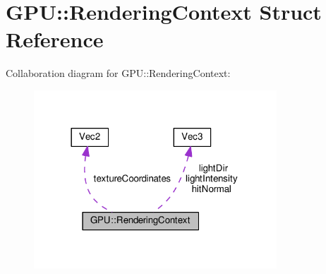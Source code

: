 \hypertarget{struct_g_p_u_1_1_rendering_context}{}\section{G\+PU\+:\+:Rendering\+Context Struct Reference}
\label{struct_g_p_u_1_1_rendering_context}


Collaboration diagram for G\+PU\+:\+:Rendering\+Context\+:
\nopagebreak
\begin{figure}[H]
\begin{center}
\leavevmode
\includegraphics[width=258pt]{struct_g_p_u_1_1_rendering_context__coll__graph}
\end{center}
\end{figure}
